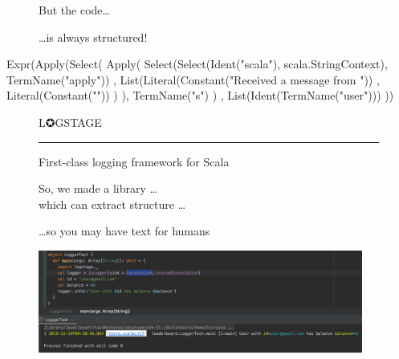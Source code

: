 \documentclass[usenames,dvipsnames,aspectratio=169]{beamer}
\begin{document}
\begin{frame}[fragile]
\begin{figure}
But the code\dots
\end{figure}
\end{frame}

\begin{frame}[fragile]
\begin{figure}
\dots is always structured!
\end{figure}
\begin{scalacode}
Expr(Apply(Select(
  Apply(
    Select(Select(Ident("scala"), scala.StringContext),
      TermName("apply"))
      , List(Literal(Constant("Received a message from "))
          , Literal(Constant(""))
        )
  ),
  TermName("s")
  )
, List(Ident(TermName("user")))
))
\end{scalacode}
\end{frame}

\begin{frame}[fragile]
  \begin{figure}
  \Huge
  \color{RubineRed} L✪GSTAGE
  \noindent
  {\color{RubineRed} \rule{\linewidth}{1mm} }
  \Large First-class logging framework for Scala
  \end{figure}

  \begin{figure}
  \Huge So, we made a library \dots \\
  which can extract structure \dots 
  \end{figure}
\end{frame}

\begin{frame}
  \begin{figure}
  \large \dots so you may have text for humans
  \end{figure}

  \begin{figure}
    \includegraphics[width=0.95\textwidth]{media/text.png}
  \end{figure}
\end{frame}
\end{document}
